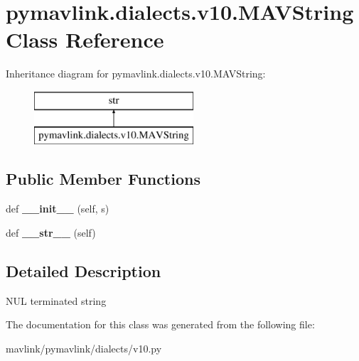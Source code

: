 \hypertarget{classpymavlink_1_1dialects_1_1v10_1_1MAVString}{}\section{pymavlink.\+dialects.\+v10.\+M\+A\+V\+String Class Reference}
\label{classpymavlink_1_1dialects_1_1v10_1_1MAVString}
Inheritance diagram for pymavlink.\+dialects.\+v10.\+M\+A\+V\+String\+:\begin{figure}[H]
\begin{center}
\leavevmode
\includegraphics[height=2.000000cm]{classpymavlink_1_1dialects_1_1v10_1_1MAVString}
\end{center}
\end{figure}
\subsection*{Public Member Functions}
\begin{DoxyCompactItemize}
\item 
\mbox{\label{classpymavlink_1_1dialects_1_1v10_1_1MAVString_a36aa66be376e60a27008c7b50bea61e0}} 
def {\bfseries \+\_\+\+\_\+init\+\_\+\+\_\+} (self, s)
\item 
\mbox{\label{classpymavlink_1_1dialects_1_1v10_1_1MAVString_aecca1f9f6ff12c7d3032ab3e57a521fc}} 
def {\bfseries \+\_\+\+\_\+str\+\_\+\+\_\+} (self)
\end{DoxyCompactItemize}


\subsection{Detailed Description}
\begin{DoxyVerb}NUL terminated string\end{DoxyVerb}
 

The documentation for this class was generated from the following file\+:\begin{DoxyCompactItemize}
\item 
mavlink/pymavlink/dialects/v10.\+py\end{DoxyCompactItemize}
